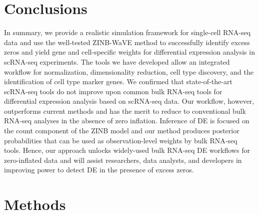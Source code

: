 \documentclass{bmcart}
\begin{document}


\section*{Conclusions}

In summary, we provide a realistic simulation framework for single-cell RNA-seq data and use the well-tested ZINB-WaVE method to successfully identify excess zeros and yield gene and cell-specific weights for differential expression analysis in scRNA-seq experiments. The tools we have developed allow an integrated workflow for normalization, dimensionality reduction, cell type discovery, and the identification of cell type marker genes. We confirmed that state-of-the-art scRNA-seq tools do not improve upon common bulk RNA-seq tools for differential expression analysis based on scRNA-seq data. Our workflow, however, outperforms current methods and has the merit to reduce to conventional bulk RNA-seq analyses in the absence of zero inflation. Inference of DE is focused on the count component of the ZINB model and our method produces posterior probabilities that can be used as observation-level weights by bulk RNA-seq tools. Hence, our approach unlocks widely-used bulk RNA-seq DE workflows for zero-inflated data and will assist researchers, data analysts, and developers in improving power to detect DE in the presence of excess zeros. 


\section*{Methods}
\end{document}
